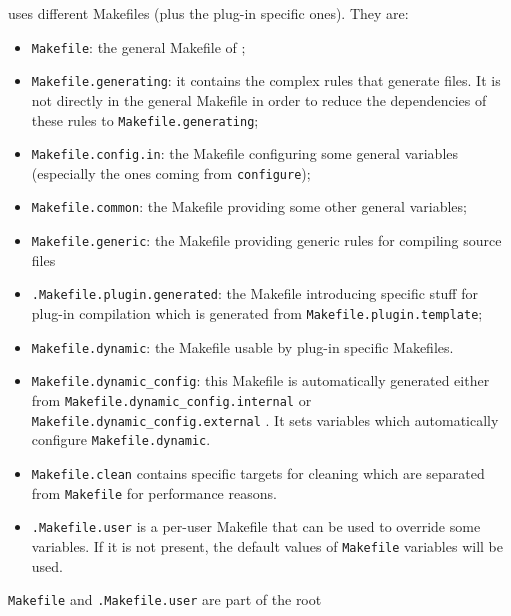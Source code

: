\framac uses different Makefiles (plus the plug-in specific ones). They are:
\begin{itemize}
\item \texttt{Makefile}: the general Makefile of
  \framac;
\item \texttt{Makefile.generating}:
  it contains the complex rules that generate files. It is not
  directly in the general Makefile in order to reduce the dependencies
  of these rules to \texttt{Makefile.generating};
\item \texttt{Makefile.config.in}: the Makefile
  configuring some general variables (especially the ones coming from
  \texttt{configure});
\item \texttt{Makefile.common}: the Makefile
  providing some other general variables;
\item \texttt{Makefile.generic}: the Makefile
  providing generic rules for compiling source files
\item
  \texttt{.Makefile.plugin.generated}:
  the Makefile introducing specific stuff for plug-in compilation which is
  generated from
  \texttt{Makefile.plugin.template};
\item \texttt{Makefile.dynamic}: the Makefile
  usable by plug-in specific Makefiles.
\item \texttt{Makefile.dynamic\_config}:
  this Makefile is automatically generated either from
  \texttt{Makefile.dynamic\_config.internal}%
   or
  \texttt{Makefile.dynamic\_config.external}%
  . It sets variables which
  automatically configure \texttt{Makefile.dynamic}.
\item \texttt{Makefile.clean} contains specific
  targets for cleaning which are separated from \texttt{Makefile} for
  performance reasons.
\item \texttt{.Makefile.user} is a per-user
  Makefile that can be used to override some variables. If it is not present,
  the default values of \texttt{Makefile} variables will be used.
\end{itemize}
\texttt{Makefile} and
\texttt{.Makefile.user} are part of the root
